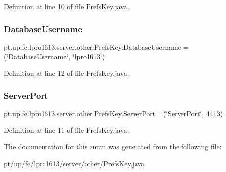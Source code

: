 Definition at line 10 of file Prefs\+Key.\+java.

\hypertarget{enumpt_1_1up_1_1fe_1_1lpro1613_1_1server_1_1other_1_1_prefs_key_a1f5081d54a2b9ebb5e46de69a24b9853}{}\label{enumpt_1_1up_1_1fe_1_1lpro1613_1_1server_1_1other_1_1_prefs_key_a1f5081d54a2b9ebb5e46de69a24b9853} 
\subsubsection{\texorpdfstring{Database\+Username}{DatabaseUsername}}
{\footnotesize\ttfamily pt.\+up.\+fe.\+lpro1613.\+server.\+other.\+Prefs\+Key.\+Database\+Username =(\char`\"{}Database\+Username\char`\"{}, \char`\"{}lpro1613\char`\"{})}



Definition at line 12 of file Prefs\+Key.\+java.

\hypertarget{enumpt_1_1up_1_1fe_1_1lpro1613_1_1server_1_1other_1_1_prefs_key_a92ee06ea77e828cd8272275f9309e142}{}\label{enumpt_1_1up_1_1fe_1_1lpro1613_1_1server_1_1other_1_1_prefs_key_a92ee06ea77e828cd8272275f9309e142} 
\subsubsection{\texorpdfstring{Server\+Port}{ServerPort}}
{\footnotesize\ttfamily pt.\+up.\+fe.\+lpro1613.\+server.\+other.\+Prefs\+Key.\+Server\+Port =(\char`\"{}Server\+Port\char`\"{}, 4413)}



Definition at line 11 of file Prefs\+Key.\+java.



The documentation for this enum was generated from the following file\+:\begin{DoxyCompactItemize}
\item 
pt/up/fe/lpro1613/server/other/\hyperlink{pt_2up_2fe_2lpro1613_2server_2other_2_prefs_key_8java}{Prefs\+Key.\+java}\end{DoxyCompactItemize}
